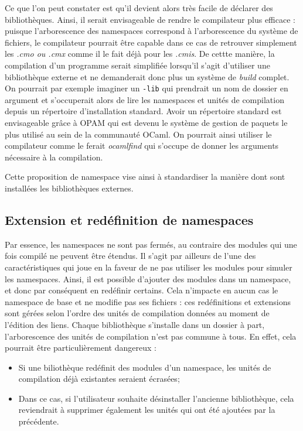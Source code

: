 \documentclass[11pt,a4paper]{report}
\begin{document}
Ce que l'on peut constater est qu'il devient alors très facile de déclarer des
bibliothèques. Ainsi, il serait envisageable de rendre le compilateur plus
efficace : puisque l'arborescence des namespaces correspond à l'arborescence du
système de fichiers, le compilateur pourrait être capable dans ce cas de
retrouver simplement les \emph{.cmo ou .cmx} comme il le fait déjà pour les
\emph{.cmis}. De cettte manière, la compilation d'un programme serait simplifiée
lorsqu'il s'agit d'utiliser une bibliothèque externe et ne demanderait donc plus
un système de \emph{build} complet. On pourrait par exemple imaginer un
\texttt{-lib} qui prendrait un nom de dossier en argument et s'occuperait alors
de lire les namespaces et unités de compilation depuis un répertoire
d'installation standard. Avoir un répertoire standard est envisageable grâce à
OPAM qui est devenu le système de gestion de paquets le plus utilisé au sein de
la communauté OCaml. On pourrait ainsi utiliser le compilateur comme le ferait
\emph{ocamlfind} qui s'occupe de donner les arguments nécessaire à la compilation.

Cette proposition de namespace vise ainsi à standardiser la manière dont sont
installées les bibliothèques externes.

\subsection{Extension et redéfinition de namespaces}

Par essence, les namespaces ne sont pas fermés, au contraire des modules qui
une fois compilé ne peuvent être étendus. Il s'agit par ailleurs de l'une des
caractéristiques qui joue en la faveur de ne pas utiliser les modules pour
simuler les namespaces. Ainsi, il est possible d'ajouter des modules dans un
namespace, et donc par conséquent en redéfinir certains. Cela n'impacte en aucun
cas le namespace de base et ne modifie pas ses fichiers : ces redéfinitions et
extensions sont gérées selon l'ordre des unités de compilation données au moment
de l'édition des liens. Chaque bibliothèque s'installe dans un dossier à part,
l'arborescence des unités de compilation n'est pas commune à tous. En effet,
cela pourrait être particulièrement dangereux :
\begin{itemize}
\item Si une biliothèque redéfinit des modules d'un namespace, les unités de
  compilation déjà existantes seraient écrasées;
\item Dans ce cas, si l'utilisateur souhaite désinstaller l'ancienne
  bibliothèque, cela reviendrait à supprimer également les unités qui ont été
  ajoutées par la précédente.
\end{itemize}
\end{document}
